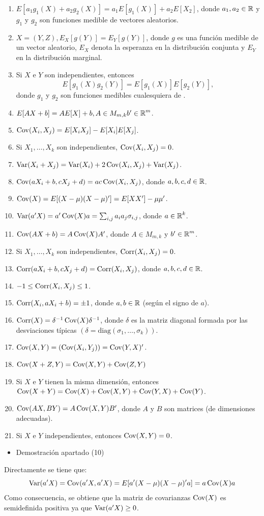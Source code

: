 \begin{enumerate}[label=\color{lightblue}\arabic*)]
	\item $E[a_1g_1(X)+a_2g_2(X)]=a_1E[g_1(X)]+a_2E[X_2]$, donde $a_1,a_2\in\operatorname{\mathbb{R}}$ y $g_1$ y $g_2$ son funciones medible de vectores aleatorios.
	\item $X=(Y,Z),E_X[g(Y)]=E_Y[g(Y)]$, donde $g$ es una función medible de un vector aleatorio, $E_X$ denota la esperanza en la distribución conjunta y $E_Y$ en la distribución marginal.
	\item Si $X$ e $Y$ son independientes, entonces \[ E[g_1(X)g_2(Y)]=E[g_1(X)]E[g_2(Y)], \] donde $g_1$ y $g_2$ son funciones medibles cualesquiera de \veas.
	\item $E[AX+b]=AE[X]+b,A\in M_{m,k}b'\in\operatorname{\mathbb{R}}^m$.
	\item $\operatorname{Cov}(X_i,X_j)=E[X_iX_j]-E[X_i]E[X_j]$.
	\item Si $X_1,\dots,X_k$ son independientes, $\operatorname{Cov}(X_i,X_j)=0$.
	\item $\operatorname{Var}(X_i+X_j)=\operatorname{Var}(X_i)+2\operatorname{Cov}(X_i,X_j)+\operatorname{Var}(X_j)$.
	\item $\operatorname{Cov}(aX_i+b,cX_j+d)=ac\operatorname{Cov}(X_i,X_j)$, donde $a,b,c,d\in\operatorname{\mathbb{R}}$.
	\item $\operatorname{Cov}(X)=E[(X-\mu)(X-\mu)']=E[XX']-\mu\mu'$.
	\item $\operatorname{Var}(a'X)=a'\operatorname{Cov}(X)a=\sum_{i,j}a_ia_j\sigma_{i,j}$, donde $a\in\operatorname{\mathbb{R}}^k$.
	\item $\operatorname{Cov}(AX+b)=A\operatorname{Cov}(X)A'$, donde $A\in M_{m,k}$ y $b'\in\operatorname{\mathbb{R}}^m$.
	\item Si $X_1,\dots,X_k$ son independientes, $\operatorname{Corr}(X_i,X_j)=0$.
	\item $\operatorname{Corr}(aX_i+b,cX_j+d)=\operatorname{Corr}(X_i,X_j)$, donde $a,b,c,d\in\operatorname{\mathbb{R}}$.
	\item $-1\le\operatorname{Corr}(X_i,X_j)\le1$.
	\item $\operatorname{Corr}(X_i,aX_i+b)=\pm1$, donde $a,b\in\operatorname{\mathbb{R}}$ (según el signo de $a$).
	\item $\operatorname{Corr}(X)=\delta^{-1}\operatorname{Cov}(X)\delta^{-1}$, donde $\delta$ es la matriz diagonal formada por las desviaciones típicas $\left(\delta=\mathrm{diag}(\sigma_1,\dots,\sigma_k)\right)$.
	\item $\operatorname{Cov}(X,Y)=\left(\operatorname{Cov}(X_i,Y_j)\right)=\operatorname{Cov}(Y,X)'$.
	\item $\operatorname{Cov}(X+Z,Y)=\operatorname{Cov}(X,Y)+\operatorname{Cov}(Z,Y)$
	\item Si $X$ e $Y$ tienen la misma dimensión, entonces $\operatorname{Cov}(X+Y)=\operatorname{Cov}(X)+\operatorname{Cov}(X,Y)+\operatorname{Cov}(Y,X)+\operatorname{Cov}(Y)$.
	\item $\operatorname{Cov}(AX,BY)=A\operatorname{Cov}(X,Y)B'$, donde $A$ y $B$ son matrices (de dimensiones adecuadas).
	\item Si $X$ e $Y$ independientes, entonces $\operatorname{Cov}(X,Y)=0$.
\end{enumerate}
\begin{itemize}[label=\color{red}\textbullet, leftmargin=*]
	\item \color{lightblue}Demostración apartado (10)
\end{itemize}
Directamente se tiene que: \[ \operatorname{Var}(a'X)=\operatorname{Cov}(a'X,a'X)=E[a'(X-\mu)(X-\mu)'a]=a\operatorname{Cov}(X)a \]
Como consecuencia, se obtiene que la matriz de covarianzas $\operatorname{Cov}(X)$ es semidefinida positiva ya que $\operatorname{Var}(a'X)\ge0$.

